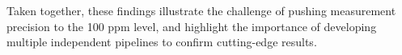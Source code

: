 \documentclass[twocolumn,trackchanges]{aastex62}
\begin{document}
Taken together, these findings illustrate the challenge of pushing measurement precision to the 100 ppm level, and highlight the importance of developing multiple independent pipelines to confirm cutting-edge results. 
 
 




\end{document}
